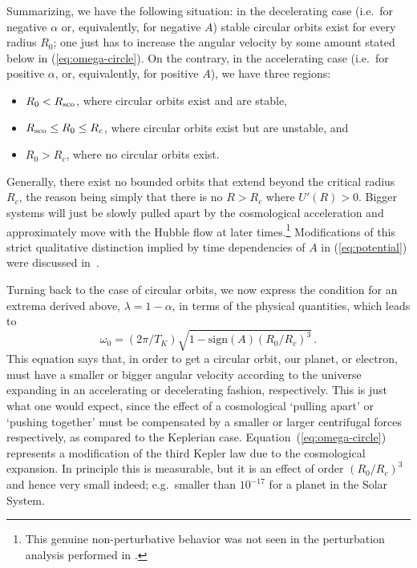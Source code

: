 \documentclass
[rmp,aps,twocolumn,showpacs,preprintnumbers,amsmath,amssymb]{revtex4}
\theoremstyle{plain}
\theoremstyle{definition}
\theoremstyle{remark}
\begin{document}
Summarizing, we have the following situation: in the decelerating case 
(i.e.~for negative $\alpha$ or, equivalently, for negative $A$) stable 
circular orbits exist for every radius $R_0$; one just has to increase 
the angular velocity by some amount stated below in 
(\ref{eq:omega-circle}). On the contrary, in the  accelerating case 
(i.e.~for positive $\alpha$, or, equivalently, for positive $A$), 
we have three regions:
%
\begin{itemize}
\item $R_0 < R_{\rm sco}$, 
      where circular orbits exist and are stable, 
\item $R_{\rm sco} \leq R_0 \leq R_c$, 
      where circular orbits exist but are unstable, and 
\item $R_0 > R_c$, 
      where no circular orbits exist.
\end{itemize}
%
Generally, there exist no bounded orbits that extend beyond the 
critical radius $R_c$, the reason being simply that there is no 
$R>R_c$ where $U'(R)>0$. Bigger systems will just be slowly 
pulled apart by the cosmological acceleration and approximately 
move with the Hubble flow at later times.\footnote{This genuine 
non-perturbative behavior was not seen in the perturbation analysis 
performed in \cite{Cooperstock.etal:1998}.} Modifications of this 
strict qualitative distinction implied by time dependencies of $A$ 
in (\ref{eq:potential}) were discussed in~\cite{Faraoni.Jacques:2007}.

Turning back to the case of circular orbits, we now express the 
condition for an extrema derived above, $\lambda=1-\alpha$, in 
terms of the physical quantities, which leads to 
%
\begin{equation}\label{eq:omega-circle}
  \omega_0 = (2\pi/T_K)\sqrt{1-\mathrm{sign}(A)(R_0/R_c)^3} \,.
\end{equation}
%
This equation says that, in order to get a circular orbit, our planet, 
or electron, must have a smaller or bigger angular velocity according 
to the universe expanding in an accelerating or decelerating fashion, 
respectively. This is just what one would expect, since the effect of 
a cosmological `pulling apart' or `pushing together' must be 
compensated by a smaller or larger centrifugal forces respectively,
as compared to the Keplerian case. Equation~(\ref{eq:omega-circle}) 
represents a modification of the third Kepler law due to the 
cosmological expansion. In principle this is measurable, but it is 
an effect of order $(R_0/R_c)^3$ and hence very small indeed; 
e.g.~smaller than $10^{-17}$ for a planet in the Solar System.
\end{document}

